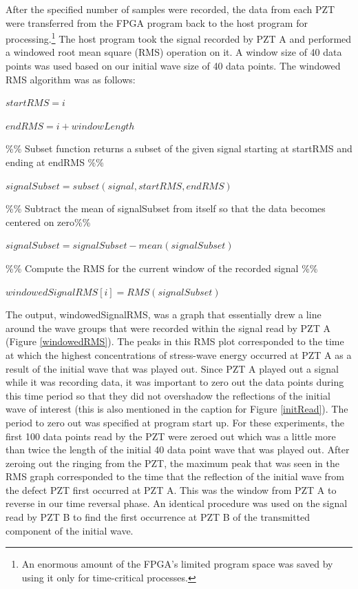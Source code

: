 \documentclass[11pt,letterpaper]{article}%
\begin{document}
After the specified number of samples were recorded, the data from each PZT were transferred from the FPGA program back to the host program for processing.\footnote{An enormous amount of the FPGA's limited program space was saved by using it only for time-critical processes.} The host program took the signal recorded by PZT A and performed a windowed root mean square (RMS) operation on it. A window size of 40 data points was used based on our initial wave size of 40 data points. The windowed RMS algorithm was as follows:

\begin{algorithmic}


$startRMS = i$

$endRMS = i + windowLength$

\%\% Subset function returns a subset of the given signal starting at startRMS and ending at endRMS \%\%

$signalSubset = subset( signal, startRMS, endRMS )$

\%\% Subtract the mean of signalSubset from itself so that the data becomes centered on zero\%\%

$signalSubset = signalSubset  - mean(signalSubset)$

\%\% Compute the RMS for the current window of the recorded signal \%\%

$windowedSignalRMS[ i ] = RMS( signalSubset ) $	

\EndFor

\end{algorithmic}

The output, windowedSignalRMS, was a graph that essentially drew a line around the wave groups that were recorded within the signal read by PZT A (Figure \ref{windowedRMS}). The peaks in this RMS plot corresponded to the time at which the highest concentrations of stress-wave energy occurred at PZT A as a result of the initial wave that was played out. Since PZT A played out a signal while it was recording data, it was important to zero out the data points during this time period so that they did not overshadow the reflections of the initial wave of interest (this is also mentioned in the caption for Figure \ref{initRead}). The period to zero out was specified at program start up. For these experiments, the first 100 data points read by the PZT were zeroed out which was a little more than twice the length of the initial 40 data point wave that was played out. After zeroing out the ringing from the PZT, the maximum peak that was seen in the RMS graph corresponded to the time that the reflection of the initial wave from the defect PZT first occurred at PZT A. This was the window from PZT A to reverse in our time reversal phase. An identical procedure was used on the signal read by PZT B to find the first occurrence at PZT B of the transmitted component of the initial wave.
\end{document}
